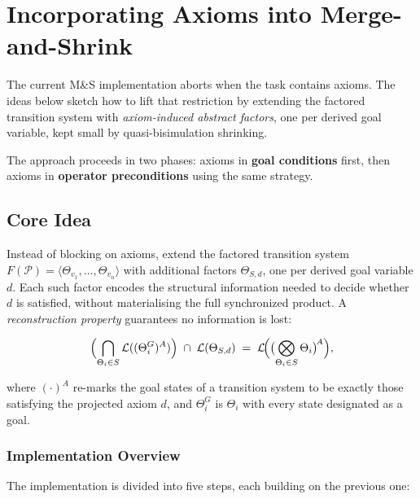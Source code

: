 \documentclass[11pt,a4paper]{article}
\begin{document}
\section{Incorporating Axioms into Merge-and-Shrink}

The current M\&S implementation aborts when the task contains axioms.  The
ideas below sketch how to lift that restriction by extending the factored
transition system with \emph{axiom-induced abstract factors}, one per derived
goal variable, kept small by quasi-bisimulation shrinking.

The approach proceeds in two phases: axioms in \textbf{goal conditions} first,
then axioms in \textbf{operator preconditions} using the same strategy.

\subsection{Core Idea}
\label{sec:core-idea}

Instead of blocking on axioms, extend the factored transition system
$F(\mathcal{P}) = \langle \Theta_{v_1}, \ldots, \Theta_{v_n} \rangle$ with
additional factors $\Theta_{S,d}$, one per derived goal variable $d$.  Each
such factor encodes the structural information needed to decide whether $d$ is
satisfied, without materialising the full synchronized product.  A
\emph{reconstruction property} guarantees no information is lost:

\[
  \Bigl(\bigcap_{\Theta_i \in S} \mathcal{L}((\Theta_i^G)^A)\Bigr)
  \;\cap\;
  \mathcal{L}(\Theta_{S,d})
  \;=\;
  \mathcal{L}\!\Bigl(\bigl(\bigotimes_{\Theta_i \in S} \Theta_i\bigr)^{\!A}\Bigr),
\]

where $(\cdot)^A$ re-marks the goal states of a transition system to be
exactly those satisfying the projected axiom $d$, and $\Theta_i^G$ is
$\Theta_i$ with every state designated as a goal.

\subsubsection*{Implementation Overview}

The implementation is divided into five steps, each building on the previous
one:
\end{document}
